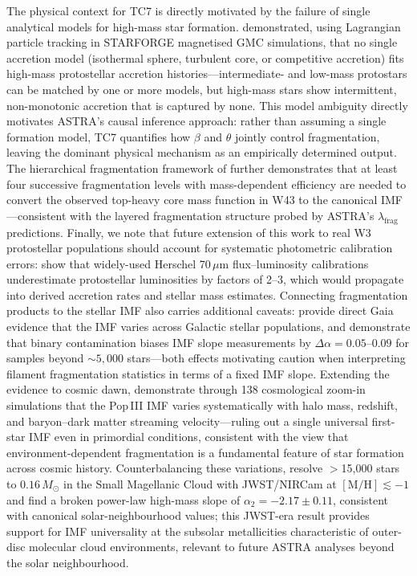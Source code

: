 \documentclass[usenatbib]{rasti}
\begin{document}
The physical context for TC7 is directly motivated by the failure of single analytical models for high-mass star formation. \citet{kaalva2026} demonstrated, using Lagrangian particle tracking in STARFORGE magnetised GMC simulations, that no single accretion model (isothermal sphere, turbulent core, or competitive accretion) fits high-mass protostellar accretion histories---intermediate- and low-mass protostars can be matched by one or more models, but high-mass stars show intermittent, non-monotonic accretion that is captured by none. This model ambiguity directly motivates ASTRA's causal inference approach: rather than assuming a single formation model, TC7 quantifies how $\beta$ and $\theta$ jointly control fragmentation, leaving the dominant physical mechanism as an empirically determined output. The hierarchical fragmentation framework of \citet{thomasson2026} further demonstrates that at least four successive fragmentation levels with mass-dependent efficiency are needed to convert the observed top-heavy core mass function in W43 to the canonical IMF---consistent with the layered fragmentation structure probed by ASTRA's $\lambda_\mathrm{frag}$ predictions. Finally, we note that future extension of this work to real W3 protostellar populations should account for systematic photometric calibration errors: \citet{dunham2026} show that widely-used Herschel 70\,$\mu$m flux--luminosity calibrations underestimate protostellar luminosities by factors of 2--3, which would propagate into derived accretion rates and stellar mass estimates. Connecting fragmentation products to the stellar IMF also carries additional caveats: \citet{steinhardt2026} provide direct Gaia evidence that the IMF varies across Galactic stellar populations, and \citet{rosen2026} demonstrate that binary contamination biases IMF slope measurements by $\Delta\alpha = 0.05$--$0.09$ for samples beyond ${\sim}5{,}000$ stars---both effects motivating caution when interpreting filament fragmentation statistics in terms of a fixed IMF slope.
Extending the evidence to cosmic dawn, \citet{hirano2026popiii} demonstrate through 138 cosmological zoom-in simulations that the Pop\,III IMF varies systematically with halo mass, redshift, and baryon--dark matter streaming velocity---ruling out a single universal first-star IMF even in primordial conditions, consistent with the view that environment-dependent fragmentation is a fundamental feature of star formation across cosmic history.
Counterbalancing these variations, \citet{cohen2026smc} resolve $>$15,000 stars to $0.16\,M_\odot$ in the Small Magellanic Cloud with JWST/NIRCam at $[\mathrm{M/H}] \lesssim -1$ and find a broken power-law high-mass slope of $\alpha_2 = -2.17 \pm 0.11$, consistent with canonical solar-neighbourhood values; this JWST-era result provides support for IMF universality at the subsolar metallicities characteristic of outer-disc molecular cloud environments, relevant to future ASTRA analyses beyond the solar neighbourhood.
\end{document}
